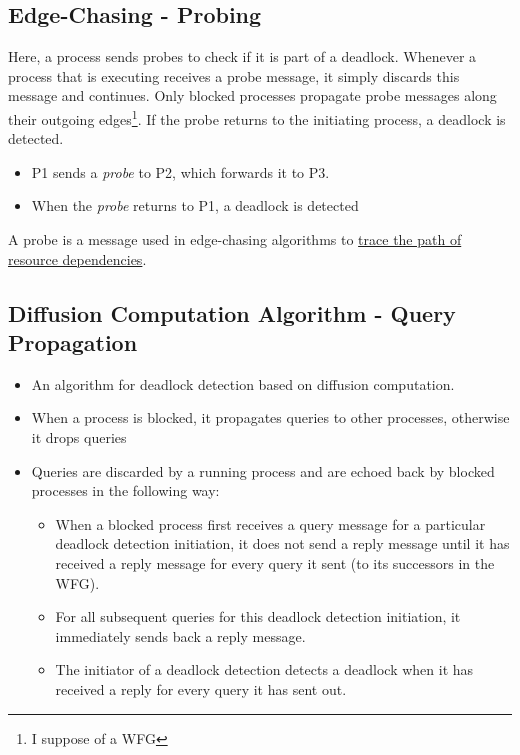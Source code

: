 \subsection{Edge-Chasing - Probing}
Here, a process sends probes to check if it is part of a deadlock.
Whenever a process that is executing receives a probe message, it simply discards this message and continues. Only blocked processes propagate probe messages along their outgoing edges\footnote{I suppose of a WFG}. If the probe returns to the initiating process, a deadlock is detected.

\begin{itemize}
	\item P1 sends a \textit{probe} to P2, which forwards it to P3.
	\item When the \textit{probe} returns to P1, a deadlock is detected
\end{itemize}

A probe is a message used in edge-chasing algorithms to \ul{trace the path of resource dependencies}.

\subsection{Diffusion Computation Algorithm - Query Propagation}
\begin{itemize}
	\item An algorithm for deadlock detection based on diffusion computation.
	\item When a process is blocked, it propagates queries to other processes, otherwise it drops queries
	\item Queries are discarded by a running process and are echoed back by blocked processes in the following way:
   \begin{itemize}
   	\item When a blocked process first receives a query message for a particular deadlock detection initiation, it does not send a reply message until it has received a reply message for every query it sent (to its successors in the WFG).
   	\item For all subsequent queries for this deadlock detection initiation, it immediately sends back a reply message.
   	\item The initiator of a deadlock detection detects a deadlock when it has received a reply for every query it has sent out.
   \end{itemize}
\end{itemize}

